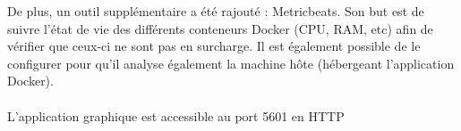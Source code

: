 \documentclass{article}
\begin{document}
        \indent De plus, un outil supplémentaire a été rajouté : Metricbeats. Son but est de suivre l'état de vie des différents conteneurs Docker (CPU, RAM, etc) afin de vérifier que ceux-ci ne sont pas en surcharge. Il est également possible de le configurer pour qu'il analyse également la machine hôte (hébergeant l'application Docker).\\
        \\
        L'application graphique est accessible au port 5601 en HTTP
    
\end{document}
